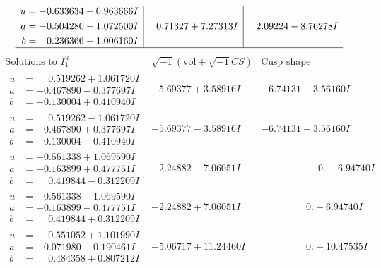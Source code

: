 \documentclass[1p]{elsarticle_modified}
\theoremstyle{definition}
\newcommand{\I}{\sqrt{-1}}
\begin{document}
$$\begin{array}{c|c|c}
\begin{aligned}
u &= -0.633634 - 0.963666 I \\
a &= -0.504280 - 1.072500 I \\
b &= \phantom{-}0.236366 - 1.006160 I\end{aligned}
 & \phantom{-}0.71327 + 7.27313 I & \phantom{-}2.09224 - 8.76278 I\\
 \hline 
 \end{array}$$\newpage$$\begin{array}{c|c|c}  
\text{Solutions to }I^u_{1}& \I (\text{vol} + \sqrt{-1}CS) & \text{Cusp shape}\\
 \hline 
\begin{aligned}
u &= \phantom{-}0.519262 + 1.061720 I \\
a &= -0.467890 - 0.377697 I \\
b &= -0.130004 + 0.410940 I\end{aligned}
 & -5.69377 + 3.58916 I & -6.74131 - 3.56160 I \\ \hline\begin{aligned}
u &= \phantom{-}0.519262 - 1.061720 I \\
a &= -0.467890 + 0.377697 I \\
b &= -0.130004 - 0.410940 I\end{aligned}
 & -5.69377 - 3.58916 I & -6.74131 + 3.56160 I \\ \hline\begin{aligned}
u &= -0.561338 + 1.069590 I \\
a &= -0.163899 + 0.477751 I \\
b &= \phantom{-}0.419844 - 0.312209 I\end{aligned}
 & -2.24882 - 7.06051 I & \phantom{-0.000000 -}0. + 6.94740 I \\ \hline\begin{aligned}
u &= -0.561338 - 1.069590 I \\
a &= -0.163899 - 0.477751 I \\
b &= \phantom{-}0.419844 + 0.312209 I\end{aligned}
 & -2.24882 + 7.06051 I & \phantom{-0.000000 } 0. - 6.94740 I \\ \hline\begin{aligned}
u &= \phantom{-}0.551052 + 1.101990 I \\
a &= -0.071980 - 0.190461 I \\
b &= \phantom{-}0.484358 + 0.807212 I\end{aligned}
 & -5.06717 + 11.24460 I & \phantom{-0.000000 } 0. - 10.47535 I \\ \hline\begin{aligned}

\end{aligned}
\end{array}$$
\end{document}
